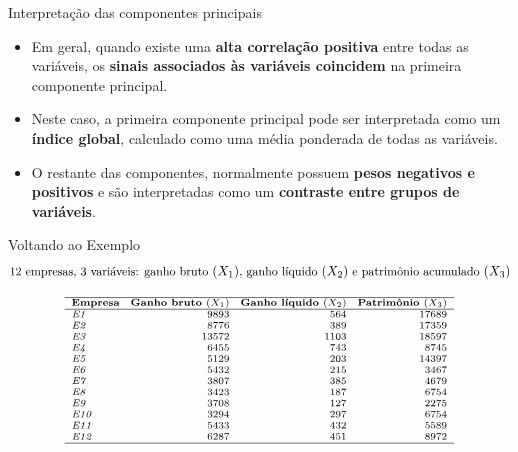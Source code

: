 \documentclass[
  ignorenonframetext,
  aspectratio=169,
]{beamer}
\providecommand{\tightlist}{%
  \setlength{\itemsep}{0pt}\setlength{\parskip}{0pt}}
\begin{document}
\begin{frame}{Interpretação das componentes principais}
\label{interpretauxe7uxe3o-das-componentes-principais}
\begin{itemize}
\tightlist
\item
  Em geral, quando existe uma \textbf{alta correlação positiva} entre
  todas as variáveis, os \textbf{sinais associados às variáveis
  coincidem} na primeira componente principal.
\end{itemize}

\pause

\begin{itemize}
\tightlist
\item
  Neste caso, a primeira componente principal pode ser interpretada como
  um \textbf{índice global}, calculado como uma média ponderada de todas
  as variáveis.
\end{itemize}

\pause

\begin{itemize}
\tightlist
\item
  O restante das componentes, normalmente possuem \textbf{pesos
  negativos e positivos} e são interpretadas como um \textbf{contraste
  entre grupos de variáveis}.
\end{itemize}
\end{frame}

\begin{frame}{Voltando ao Exemplo}
\label{voltando-ao-exemplo}
\[\small
\text{12 empresas, 3 variáveis: ganho bruto }(X_1)\text{, ganho líquido }(X_2)\text{ e patrimônio acumulado }(X_3)
\]

\[\scriptsize
\begin{array}{l @{\quad} r @{\quad} r @{\quad} r}
\hline
\textbf{Empresa} &
\textbf{Ganho bruto }(X_1) &
\textbf{Ganho líquido }(X_2) &
\textbf{Patrimônio }(X_3) \\
\hline
\mathit{E1}  & 9893  & 564  & 17689 \\
\mathit{E2}  & 8776  & 389  & 17359 \\
\mathit{E3}  & 13572 & 1103 & 18597 \\
\mathit{E4}  & 6455  & 743  & 8745 \\
\mathit{E5}  & 5129  & 203  & 14397 \\
\mathit{E6}  & 5432  & 215  & 3467 \\
\mathit{E7}  & 3807  & 385  & 4679 \\
\mathit{E8}  & 3423  & 187  & 6754 \\
\mathit{E9}  & 3708  & 127  & 2275 \\
\mathit{E10} & 3294  & 297  & 6754 \\
\mathit{E11} & 5433  & 432  & 5589 \\
\mathit{E12} & 6287  & 451  & 8972 \\
\hline
\end{array}
\]
\end{frame}
\end{document}

